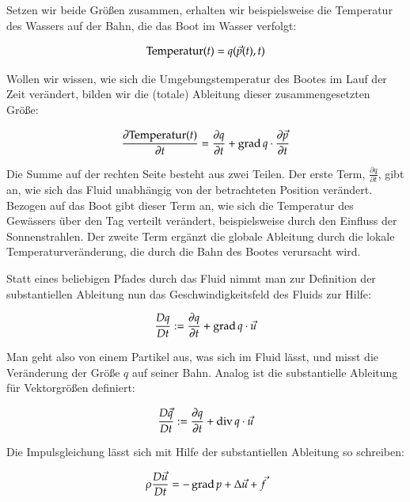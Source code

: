Setzen wir beide Größen zusammen, erhalten wir beispielsweise die
Temperatur des Wassers auf der Bahn, die das Boot im Wasser verfolgt:

\begin{equation}
\textnormal{Temperatur}(t) = q(\vec{p}(t),t)
\end{equation}

Wollen wir wissen, wie sich die Umgebungstemperatur des Bootes im Lauf
der Zeit verändert, bilden wir die (totale) Ableitung dieser
zusammengesetzten Größe:

\begin{equation}
\frac{
	\partial \textnormal{Temperatur}(t)
}
{
	\partial t
}
=
\frac{
	\partial q
}
{
	\partial t
}
+
\operatorname*{grad} q \cdot
\frac{
	\partial \vec{p}}
{
	\partial t
}
\end{equation}

Die Summe auf der rechten Seite besteht aus zwei Teilen. Der erste Term,
$\frac{\partial q}{\partial t}$, gibt an, wie sich das Fluid unabhängig von
der betrachteten Position verändert. Bezogen auf das Boot gibt dieser
Term an, wie sich die Temperatur des Gewässers über den Tag verteilt
verändert, beispielsweise durch den Einfluss der Sonnenstrahlen. Der
zweite Term ergänzt die globale Ableitung durch die lokale
Temperaturveränderung, die durch die Bahn des Bootes verursacht
wird.

Statt eines beliebigen Pfades durch das Fluid nimmt man zur Definition der
substantiellen Ableitung nun das Geschwindigkeitsfeld des Fluids zur Hilfe:

\begin{equation}
\frac{
	Dq}
{
	Dt
} :=
\frac{
	\partial q
}
{
	\partial t
}
+
\operatorname*{grad} q \cdot
\vec{u}
\end{equation}

Man geht also von einem Partikel aus, was sich im Fluid 
lässt, und misst die Veränderung der Größe $q$ auf seiner Bahn. Analog ist die
substantielle Ableitung für Vektorgrößen definiert:

\begin{equation}
\frac{
	D\vec{q}}
{
	Dt
} :=
\frac{
	\partial q
}
{
	\partial t
}
+
\operatorname*{div} q \cdot
\vec{u}
\end{equation}

Die Impulsgleichung lässt sich mit Hilfe der substantiellen Ableitung so schreiben:

\begin{equation}
\rho \frac{D\vec{u}}{Dt} = - \operatorname*{grad} p + \Delta \vec{u} + \vec{f}
\end{equation}

